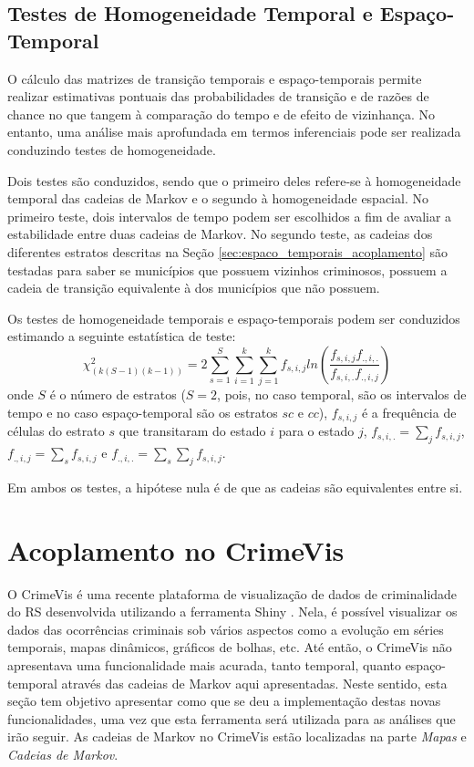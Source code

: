\documentclass[12pt,openright,oneside,a4paper,english,french,spanish]{abntex2}
\numberwithin{table}{section} %
\numberwithin{figure}{section} %
\begin{document}
\subsection{Testes de Homogeneidade Temporal e Espaço-Temporal\label{sec:testes_acoplamento}}

O cálculo das matrizes de transição temporais e espaço-temporais permite realizar estimativas pontuais das probabilidades de transição e de razões de chance no que tangem à comparação do tempo e de efeito de vizinhança. No entanto, uma análise mais aprofundada em termos inferenciais pode ser realizada conduzindo testes de homogeneidade. 

Dois testes são conduzidos, sendo que o primeiro deles refere-se à homogeneidade temporal das cadeias de Markov e o segundo à homogeneidade espacial. No primeiro teste, dois intervalos de tempo podem ser escolhidos a fim de avaliar a estabilidade entre duas cadeias de Markov. No segundo teste, as cadeias dos diferentes estratos descritas na Seção \ref{sec:espaco_temporais_acoplamento} são testadas para saber se municípios que possuem vizinhos criminosos, possuem a cadeia de transição equivalente à dos municípios que não possuem.

Os testes de homogeneidade temporais e espaço-temporais podem ser conduzidos estimando a seguinte estatística de teste:
\begin{equation}
\chi^{2}_{(k(S-1)(k-1))} = 2 \sum_{s=1}^S \sum_{i=1}^k \sum_{j=1}^k f_{s,i,j}ln\left ( \frac{f_{s,i,j}f_{.,i,.}}{f_{s,i,.}f_{.,i,j}} \right )
\label{eq:est_test_chi_espaco_temporal}
\end{equation}
onde $S$ é o número de estratos ($S=2$, pois, no caso temporal, são os intervalos de tempo e no caso espaço-temporal são os estratos $sc$ e $cc$), $f_{s,i,j}$ é a frequência de células do estrato $s$ que transitaram do estado $i$ para o estado $j$, $f_{s,i,.}=\sum_{j}f_{s,i,j}$, $f_{.,i,j}=\sum_{s}f_{s,i,j}$ e $f_{.,i,.}=\sum_{s}\sum_{j}f_{s,i,j}$.

Em ambos os testes, a hipótese nula é de que as cadeias são equivalentes entre si.

\section{Acoplamento no CrimeVis\label{sec:acomplamento_crimevis_acoplamento}}

O CrimeVis é uma recente plataforma de visualização de dados de criminalidade do RS desenvolvida utilizando a ferramenta Shiny \cite{shiny}. Nela, é possível visualizar os dados das ocorrências criminais sob vários aspectos como a evolução em séries temporais, mapas dinâmicos, gráficos de bolhas, etc. Até então, o CrimeVis não apresentava uma funcionalidade mais acurada, tanto temporal, quanto espaço-temporal através das cadeias de Markov aqui apresentadas. Neste sentido, esta seção tem objetivo apresentar como que se deu a implementação destas novas funcionalidades, uma vez que esta ferramenta será utilizada para as análises que irão seguir. As cadeias de Markov no CrimeVis estão localizadas na parte \textit{Mapas} e \textit{Cadeias de Markov}.
\end{document}
